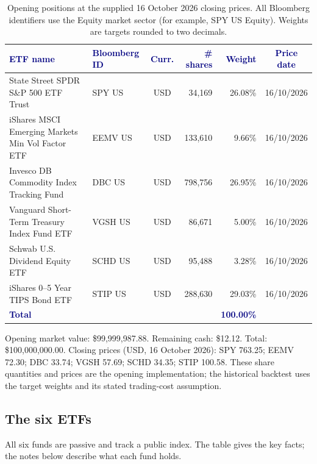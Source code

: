 \documentclass[10pt,a4paper]{article}
\renewcommand{\arraystretch}{1.3}
\newcommand{\hd}[1]{\textcolor{navy}{\textbf{#1}}}
\begin{document}
\begin{table}[H]
\centering
\small
\renewcommand{\arraystretch}{1.3}
\begin{tabularx}{\textwidth}{@{}>{\raggedright\arraybackslash}X l c r r c@{}}
\toprule
\hd{ETF name} & \hd{Bloomberg ID} & \hd{Curr.} & \hd{\# shares} & \hd{Weight} & \hd{Price date}\\
\midrule
State Street SPDR S\&P 500 ETF Trust          & SPY US & USD & 34,169 & 26.08\% & 16/10/2026\\
iShares MSCI Emerging Markets Min Vol Factor ETF & EEMV US & USD & 133,610 &  9.66\% & 16/10/2026\\
Invesco DB Commodity Index Tracking Fund      & DBC US & USD & 798,756 & 26.95\% & 16/10/2026\\
Vanguard Short-Term Treasury Index Fund ETF   & VGSH US & USD & 86,671 &  5.00\% & 16/10/2026\\
Schwab U.S. Dividend Equity ETF               & SCHD US & USD & 95,488 &  3.28\% & 16/10/2026\\
iShares 0--5 Year TIPS Bond ETF               & STIP US & USD & 288,630 & 29.03\% & 16/10/2026\\
\midrule
\hd{Total} & & & & \hd{100.00\%} & \\
\bottomrule
\end{tabularx}
\caption{Opening positions at the supplied 16 October 2026 closing prices. All Bloomberg identifiers use the Equity market sector (for example, SPY US Equity). Weights are targets rounded to two decimals.}
\label{tab:portfolio}
\end{table}

Opening market value: \$99,999,987.88. Remaining cash: \$12.12. Total: \$100,000,000.00. Closing prices (USD, 16 October 2026): SPY 763.25; EEMV 72.30; DBC 33.74; VGSH 57.69; SCHD 34.35; STIP 100.58. These share quantities and prices are the opening implementation; the historical backtest uses the target weights and its stated trading-cost assumption.

\subsection{The six ETFs}
All six funds are passive and track a public index. The table gives the key facts; the notes below
describe what each fund holds.
\end{document}
